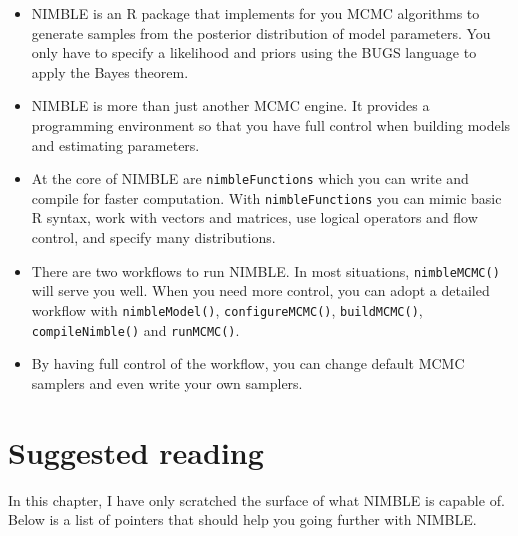 \documentclass[
  12pt,
]{krantz}
\begin{document}
\begin{itemize}
\item
  NIMBLE is an R package that implements for you MCMC algorithms to generate samples from the posterior distribution of model parameters. You only have to specify a likelihood and priors using the BUGS language to apply the Bayes theorem.
\item
  NIMBLE is more than just another MCMC engine. It provides a programming environment so that you have full control when building models and estimating parameters.
\item
  At the core of NIMBLE are \texttt{nimbleFunctions} which you can write and compile for faster computation. With \texttt{nimbleFunctions} you can mimic basic R syntax, work with vectors and matrices, use logical operators and flow control, and specify many distributions.
\item
  There are two workflows to run NIMBLE. In most situations, \texttt{nimbleMCMC()} will serve you well. When you need more control, you can adopt a detailed workflow with \texttt{nimbleModel()}, \texttt{configureMCMC()}, \texttt{buildMCMC()}, \texttt{compileNimble()} and \texttt{runMCMC()}.
\item
  By having full control of the workflow, you can change default MCMC samplers and even write your own samplers.
\end{itemize}

\section{Suggested reading}\label{suggested-reading-1}

In this chapter, I have only scratched the surface of what NIMBLE is capable of. Below is a list of pointers that should help you going further with NIMBLE.
\end{document}
